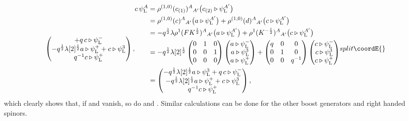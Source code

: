 \documentclass[12pt,a4paper]{article}
\providecommand{\tr}{\triangleright}
\begin{document}
\begin{equation}
{\begin{split}
\begin{pmatrix}
      +q\,c\tr \psi_\mathrm{L}^- \\
      -q^{\frac{1}{2}}\lambda[2]^{\frac{1}{2}} a\tr \psi_\mathrm{L}^+
      +c\tr \psi_\mathrm{L}^3 \\
      q^{-1} c\tr \psi_\mathrm{L}^+
    \end{pmatrix},
\end{split}
}{
\begin{split}
  c\, \psi_\mathrm{L}^A
  &= \rho^{(1,0)}(c_{(1)})^A{}_{A'}
     \bigl(c_{(2)}\tr \psi_\mathrm{L}^{A'}\bigr) \\
  &= \rho^{(1,0)}(c)^A{}_{A'} \bigl(a\tr \psi_\mathrm{L}^{A'}\bigr)
    +\rho^{(1,0)}(d)^A{}_{A'} \bigl(c\tr \psi_\mathrm{L}^{A'}\bigr) \\
  &= -q^{\frac{1}{2}}\lambda \rho^{1}(FK^{\frac{1}{2}})^A{}_{A'}
      \bigl(a\tr \psi_\mathrm{L}^{A'}\bigr)
    +\rho^{1}(K^{-\frac{1}{2}})^A{}_{A'}
      \bigl(c\tr \psi_\mathrm{L}^{A'}\bigr) \\
  &= -q^{\frac{1}{2}}\lambda[2]^{\frac{1}{2}}
    \begin{pmatrix}0&1&0\\0&0&1\\0&0&0\end{pmatrix}
    \begin{pmatrix} a\tr \psi_\mathrm{L}^-\\
                    a\tr \psi_\mathrm{L}^3\\
                    a\tr \psi_\mathrm{L}^+ \end{pmatrix}
    +\begin{pmatrix}q&0&0\\0&1&0\\0&0&q^{-1}\end{pmatrix}
    \begin{pmatrix} c\tr \psi_\mathrm{L}^-\\
                    c\tr \psi_\mathrm{L}^3\\
                    c\tr \psi_\mathrm{L}^+ \end{pmatrix} \\
  &=\begin{pmatrix}
      -q^{\frac{1}{2}}\lambda[2]^{\frac{1}{2}} a\tr \psi_\mathrm{L}^3
      +q\,c\tr \psi_\mathrm{L}^- \\
      -q^{\frac{1}{2}}\lambda[2]^{\frac{1}{2}} a\tr \psi_\mathrm{L}^+
      +c\tr \psi_\mathrm{L}^3 \\
      q^{-1} c\tr \psi_\mathrm{L}^+
    \end{pmatrix},
\end{split}
}{split}\coordE{}\end{equation}
which clearly shows that, if \coordHE{} and
\coordHE{} vanish, so do \coordHE{} and
\coordHE{}. Similar calculations can be done for the other
boost generators and right handed spinors.
\end{document}

